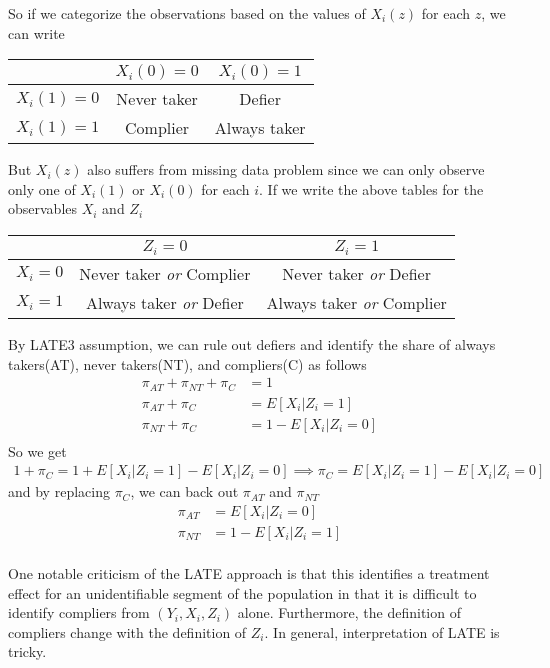 \documentclass[12pt]{article}
\theoremstyle{definition}
\theoremstyle{property}
\theoremstyle{assumption}
\theoremstyle{example}
\theoremstyle{comment}
\begin{document}
So if we categorize the observations based on the values of $X_i(z)$ for each $z$, we can write
\begin{center}
\begin{tabular}{r |c c}
& $X_i(0)=0$ &$X_i(0)=1$\\ \hline
$X_i(1)=0$& Never taker& Defier\\
$X_i(1)=1$ & Complier & Always taker\\
\end{tabular}
\end{center}
But $X_i(z)$ also suffers from missing data problem since we can only observe only one of $X_i(1)$ or $X_i(0)$ for each $i$. If we write the above tables for the observables $X_i$ and $Z_i$
\begin{center}
\begin{tabular}{r |c c}
& $Z_i=0$ &$Z_i=1$\\ \hline
$X_i=0$& Never taker \textit{or} Complier &Never taker \textit{or} Defier\\
$X_i=1$ & Always taker \textit{or} Defier & Always taker \textit{or} Complier\\
\end{tabular}
\end{center}
By LATE3 assumption, we can rule out defiers and identify the share of always takers(AT), never takers(NT), and compliers(C) as follows
\[
\begin{aligned}
\pi_{AT}+\pi_{NT}+\pi_{C}&=1\\
\pi_{AT}+\pi_{C}&=E[X_i|Z_i=1]\\
\pi_{NT}+\pi_{C}&=1-E[X_i|Z_i=0]\\
\end{aligned}
\]
So we get
\[
\begin{aligned}
1+\pi_C=1+E[X_i|Z_i=1] -E[X_i|Z_i=0] \implies \pi_C=E[X_i|Z_i=1] -E[X_i|Z_i=0] 
\end{aligned}
\]
and by replacing $\pi_C$, we can back out $\pi_{AT}$ and $\pi_{NT}$
\[
\begin{aligned}
\pi_{AT}&=E[X_i|Z_i=0]\\
\pi_{NT}&=1-E[X_i|Z_i=1]\\
\end{aligned}
\] 
\par
One notable criticism of the LATE approach is that this identifies a treatment effect for an unidentifiable segment of the population in that it is difficult to identify compliers from $(Y_i, X_i, Z_i)$ alone. Furthermore, the definition of compliers change with the definition of $Z_i$. In general, interpretation of LATE is tricky.
\end{document}
